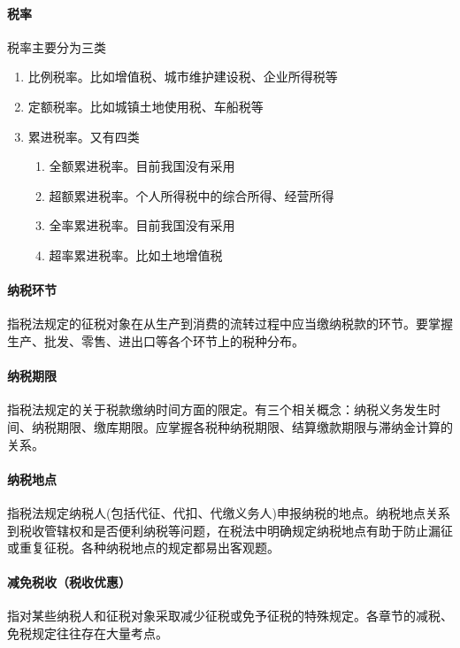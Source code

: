 \documentclass[UTF8,12pt]{ctexart}
\numberwithin{equation}{section} %
\numberwithin{figure}{section}
\numberwithin{table}{section}
\begin{document}
	\paragraph{税率}
	税率主要分为三类
	\begin{enumerate}
		\item 比例税率。比如增值税、城市维护建设税、企业所得税等
		
		\item 定额税率。比如城镇土地使用税、车船税等
		
		\item 累进税率。又有四类
		\begin{enumerate}
			\item 全额累进税率。目前我国没有采用
			
			\item 超额累进税率。个人所得税中的综合所得、经营所得
			
			\item 全率累进税率。目前我国没有采用
			
			\item 超率累进税率。比如土地增值税
		\end{enumerate}
	\end{enumerate}
	
	\paragraph{纳税环节}
	指税法规定的征税对象在从生产到消费的流转过程中应当缴纳税款的环节。要掌握生产、批发、零售、进出口等各个环节上的税种分布。
	
	\paragraph{纳税期限}
	指税法规定的关于税款缴纳时间方面的限定。有三个相关概念：纳税义务发生时间、纳税期限、缴库期限。应掌握各税种纳税期限、结算缴款期限与滞纳金计算的关系。
	
	\paragraph{纳税地点}
	指税法规定纳税人(包括代征、代扣、代缴义务人)申报纳税的地点。纳税地点关系到税收管辖权和是否便利纳税等问题，在税法中明确规定纳税地点有助于防止漏征或重复征税。各种纳税地点的规定都易出客观题。
	
	\paragraph{减免税收（税收优惠）}
	指对某些纳税人和征税对象采取减少征税或免予征税的特殊规定。各章节的减税、免税规定往往存在大量考点。
	
\end{document}
